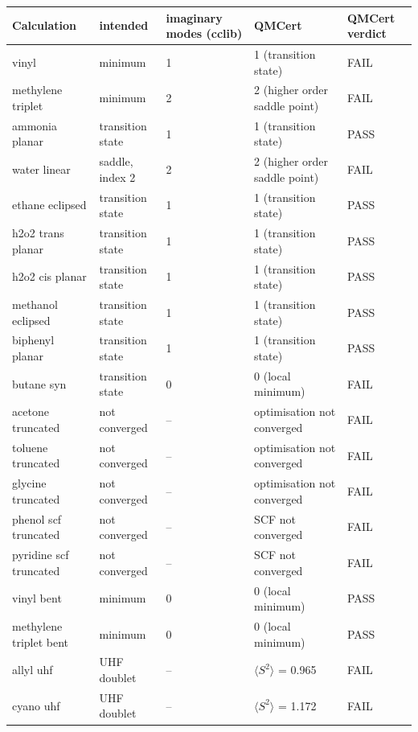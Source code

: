 \begin{tabular}{lllll}
\toprule
Calculation & intended & imaginary modes (cclib) & QMCert & QMCert verdict \\
\midrule
vinyl & minimum & 1 & 1 (transition state) & FAIL \\
methylene triplet & minimum & 2 & 2 (higher order saddle point) & FAIL \\
ammonia planar & transition state & 1 & 1 (transition state) & PASS \\
water linear & saddle, index 2 & 2 & 2 (higher order saddle point) & FAIL \\
ethane eclipsed & transition state & 1 & 1 (transition state) & PASS \\
h2o2 trans planar & transition state & 1 & 1 (transition state) & PASS \\
h2o2 cis planar & transition state & 1 & 1 (transition state) & PASS \\
methanol eclipsed & transition state & 1 & 1 (transition state) & PASS \\
biphenyl planar & transition state & 1 & 1 (transition state) & PASS \\
butane syn & transition state & 0 & 0 (local minimum) & FAIL \\
acetone truncated & not converged & -- & optimisation not converged & FAIL \\
toluene truncated & not converged & -- & optimisation not converged & FAIL \\
glycine truncated & not converged & -- & optimisation not converged & FAIL \\
phenol scf truncated & not converged & -- & SCF not converged & FAIL \\
pyridine scf truncated & not converged & -- & SCF not converged & FAIL \\
vinyl bent & minimum & 0 & 0 (local minimum) & PASS \\
methylene triplet bent & minimum & 0 & 0 (local minimum) & PASS \\
allyl uhf & UHF doublet & -- & $\langle S^2\rangle$ = 0.965 & FAIL \\
cyano uhf & UHF doublet & -- & $\langle S^2\rangle$ = 1.172 & FAIL \\
\bottomrule
\end{tabular}
